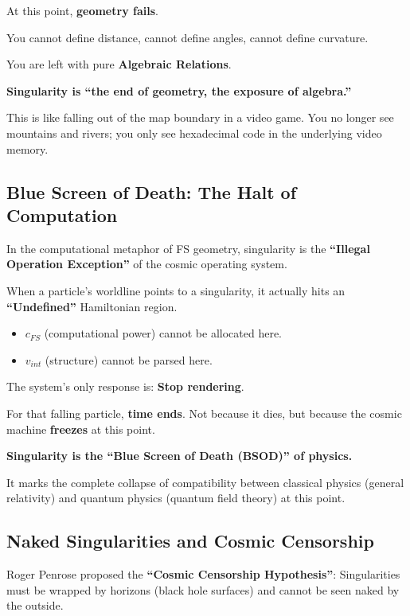 At this point, \textbf{geometry fails}.

You cannot define distance, cannot define angles, cannot define curvature.

You are left with pure \textbf{Algebraic Relations}.

\textbf{Singularity is ``the end of geometry, the exposure of algebra.''}

This is like falling out of the map boundary in a video game. You no longer see mountains and rivers; you only see hexadecimal code in the underlying video memory.

\subsection{Blue Screen of Death: The Halt of Computation}

In the computational metaphor of FS geometry, singularity is the \textbf{``Illegal Operation Exception''} of the cosmic operating system.

When a particle's worldline points to a singularity, it actually hits an \textbf{``Undefined''} Hamiltonian region.

\begin{itemize}
\item $c_{FS}$ (computational power) cannot be allocated here.

\item $v_{int}$ (structure) cannot be parsed here.
\end{itemize}

The system's only response is: \textbf{Stop rendering}.

For that falling particle, \textbf{time ends}. Not because it dies, but because the cosmic machine \textbf{freezes} at this point.

\textbf{Singularity is the ``Blue Screen of Death (BSOD)'' of physics.}

It marks the complete collapse of compatibility between classical physics (general relativity) and quantum physics (quantum field theory) at this point.

\subsection{Naked Singularities and Cosmic Censorship}

Roger Penrose proposed the \textbf{``Cosmic Censorship Hypothesis''}: Singularities must be wrapped by horizons (black hole surfaces) and cannot be seen naked by the outside.

